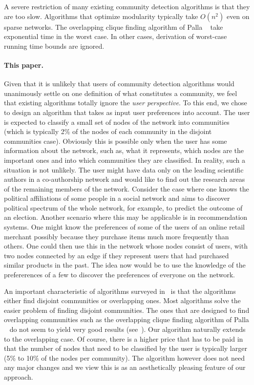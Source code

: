 A severe restriction of many existing community detection algorithms 
is that they are too slow. Algorithms that optimize modularity typically 
take $O(n^2)$ even on sparse networks. The overlapping clique finding 
algorithm of Palla \etal~\cite{PDFV05} take exponential time in the worst case.
In other cases, derivation of worst-case running time bounds are ignored. 

\paragraph{This paper.}
Given that it is unlikely that users of community detection algorithms 
would unanimously settle on one definition of what constitutes a community, 
we feel that existing algorithms totally ignore the \emph{user perspective}. To this 
end, we chose to design an algorithm that takes as input user preferences into 
account. The user is expected to classify a small set of nodes of the network 
into communities (which is typically 2\% of the nodes of each community in 
the disjoint communities case). Obviously this is possible only when the user has some 
information about the network, such as, what it represents, which nodes 
are the important ones and into which communities they are classified. 
In reality, such a situation is not unlikely. The user 
might have data only on the leading scientific authors in a co-authorship network 
and would like to find out the research areas of the remaining members of the network. 
Consider the case where one knows the political affiliations of some people in 
a social network and aims to discover political spectrum of the whole network, 
for example, to predict the outcome of an election. Another scenario where 
this may be applicable is in recommendation systems. One might know the 
preferences of some of the users of an online retail merchant possibly because
they purchase items much more frequently than others. One could then use this 
in the network whose nodes consist of users, with two nodes connected by an 
edge if they represent users that had purchased similar products in the past. 
The idea now would be to use the knowledge of the prefererences of a few to 
discover the preferences of everyone on the network. 


An important characteristic of algorithms surveyed in~\cite{LF09} 
is that the algorithms either find disjoint communities or overlapping 
ones. Most algorithms solve the easier problem of finding disjoint communities. 
The ones that are designed to find overlapping communities such as the overlapping clique finding 
algorithm of Palla \etal~\cite{PDFV05} do not seem to yield very good results (see~\cite{LF09}).
Our algorithm naturally extends to the overlapping case. Of course, there is a higher 
price that has to be paid in that the number of nodes that need to be classified by the user 
is typically larger (5\% to 10\% of the nodes per community). The algorithm however 
does not need any major changes and we view this is as an aesthetically pleasing 
feature of our approach. 

